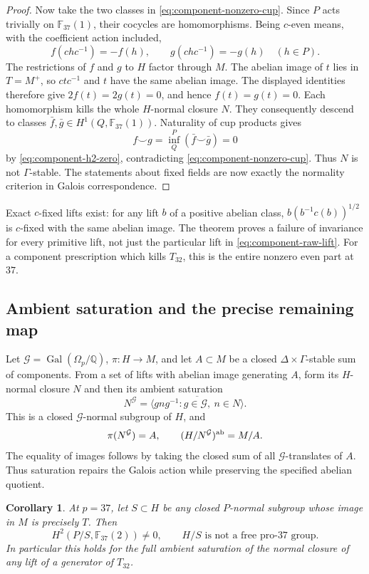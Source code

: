 \documentclass[11pt]{article}
\newtheorem{corollary}[theorem]{Corollary}
\theoremstyle{definition}\newtheorem{definition}[theorem]{Definition}
\begin{document}
\begin{proof}
Now take the two classes in \eqref{eq:component-nonzero-cup}.
Since $P$ acts trivially on $\mathbb F_{37}(1)$, their cocycles
are homomorphisms.  Being $c$-even means, with the coefficient
action included,
\[
 f(chc^{-1})=-f(h),\qquad g(chc^{-1})=-g(h)
 \quad(h\in P).
\]
The restrictions of $f$ and $g$ to $H$ factor through $M$.
The abelian image of $t$ lies in $T=M^+$, so $ctc^{-1}$ and $t$
have the same abelian image.  The displayed identities therefore
give $2f(t)=2g(t)=0$, and hence $f(t)=g(t)=0$.
Each homomorphism kills the whole $H$-normal
closure $N$.  They consequently descend to classes
$\bar f,\bar g\in H^1(Q,\mathbb F_{37}(1))$.
Naturality of cup products gives
\[
 f\smile g=\operatorname{inf}_{Q}^{P}(\bar f\smile\bar g)=0
\]
by \eqref{eq:component-h2-zero}, contradicting
\eqref{eq:component-nonzero-cup}.  Thus $N$ is not
$\Gamma$-stable.  The statements about fixed fields are now
exactly the normality criterion in Galois correspondence.
\end{proof}

Exact $c$-fixed lifts exist: for any lift $b$ of a positive abelian class,
$b(b^{-1}c(b))^{1/2}$ is $c$-fixed with the same abelian image.
The theorem proves a failure of invariance for every primitive
lift, not just the particular lift in
\eqref{eq:component-raw-lift}.  For a component prescription which
kills $T_{32}$, this is the entire nonzero even part at $37$.

\subsection{Ambient saturation and the precise remaining map}

Let $\mathcal G=\operatorname{Gal}(\Omega_p/\mathbb Q)$,
$\pi:H\to M$, and let $A\subset M$ be a closed
$\Delta\times\Gamma$-stable sum of components.  From a set of
lifts with abelian image generating $A$, form its $H$-normal
closure $N$ and then its ambient saturation
\[
 N^{\mathcal G}=
 \overline{\langle gng^{-1}:g\in\mathcal G,\ n\in N\rangle}.
\]
This is a closed $\mathcal G$-normal subgroup of $H$, and
\[
 \pi(N^{\mathcal G})=A,\qquad
 (H/N^{\mathcal G})^{\rm ab}=M/A.
\]
The equality of images follows by taking the closed sum of all
$\mathcal G$-translates of $A$.  Thus saturation repairs the
Galois action while preserving the specified abelian quotient.

\begin{corollary}\label{cor:component-saturation-not-free}
At $p=37$, let $S\subset H$ be any closed $P$-normal subgroup
whose image in $M$ is precisely $T$.  Then
\[
 H^2(P/S,\mathbb F_{37}(2))\ne0,
 \qquad H/S\text{ is not a free pro-}37\text{ group}.
\]
In particular this holds for the full ambient saturation of
the normal closure of any lift of a generator of $T_{32}$.
\end{corollary}
\end{document}

